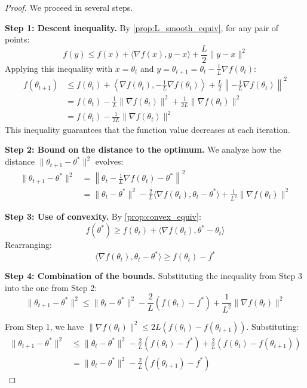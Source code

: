 \begin{proof}
	We proceed in several steps.

	\textbf{Step 1: Descent inequality.}
	By \autoref{prop:L_smooth_equiv}, for any pair of points:
	\[
		f(y) \leq f(x) + \langle \nabla f(x), y - x \rangle + \frac{L}{2}\|y - x\|^2
	\]
	Applying this inequality with \(x = \theta_t\) and \(y = \theta_{t+1} = \theta_t - \frac{1}{L}\nabla f(\theta_t)\):
	\begin{align*}
		f(\theta_{t+1}) &\leq f(\theta_t) + \left\langle \nabla f(\theta_t), -\frac{1}{L}\nabla f(\theta_t) \right\rangle + \frac{L}{2}\left\|-\frac{1}{L}\nabla f(\theta_t)\right\|^2 \\
		&= f(\theta_t) - \frac{1}{L}\|\nabla f(\theta_t)\|^2 + \frac{1}{2L}\|\nabla f(\theta_t)\|^2 \\
		&= f(\theta_t) - \frac{1}{2L}\|\nabla f(\theta_t)\|^2
	\end{align*}
	This inequality guarantees that the function value decreases at each iteration.

	\textbf{Step 2: Bound on the distance to the optimum.}
	We analyze how the distance \(\|\theta_{t+1} - \theta^*\|^2\) evolves:
	\begin{align*}
		\|\theta_{t+1} - \theta^*\|^2 &= \left\|\theta_t - \frac{1}{L}\nabla f(\theta_t) - \theta^*\right\|^2 \\
		&= \|\theta_t - \theta^*\|^2 - \frac{2}{L}\langle \nabla f(\theta_t), \theta_t - \theta^* \rangle + \frac{1}{L^2}\|\nabla f(\theta_t)\|^2
	\end{align*}

	\textbf{Step 3: Use of convexity.}
	By \autoref{prop:convex_equiv}:
	\[
		f(\theta^*) \geq f(\theta_t) + \langle \nabla f(\theta_t), \theta^* - \theta_t \rangle
	\]
	Rearranging:
	\[
		\langle \nabla f(\theta_t), \theta_t - \theta^* \rangle \geq f(\theta_t) - f^*
	\]

	\textbf{Step 4: Combination of the bounds.}
	Substituting the inequality from Step 3 into the one from Step 2:
	\[
		\|\theta_{t+1} - \theta^*\|^2 \leq \|\theta_t - \theta^*\|^2 - \frac{2}{L}(f(\theta_t) - f^*) + \frac{1}{L^2}\|\nabla f(\theta_t)\|^2
	\]

	From Step 1, we have \(\|\nabla f(\theta_t)\|^2 \leq 2L(f(\theta_t) - f(\theta_{t+1}))\). Substituting:
	\begin{align*}
		\|\theta_{t+1} - \theta^*\|^2 &\leq \|\theta_t - \theta^*\|^2 - \frac{2}{L}(f(\theta_t) - f^*) + \frac{2}{L}(f(\theta_t) - f(\theta_{t+1})) \\
		&= \|\theta_t - \theta^*\|^2 - \frac{2}{L}(f(\theta_{t+1}) - f^*)
	\end{align*}


\end{proof}
